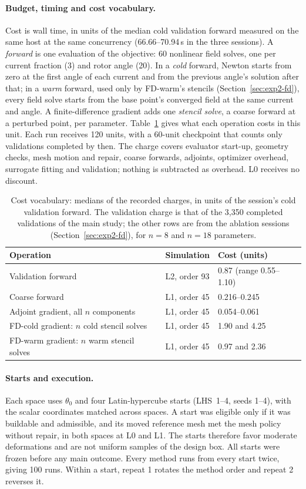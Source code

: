 \paragraph{Budget, timing and cost vocabulary.}
Cost is wall time, in units of the median cold validation forward measured
on the same host at the same concurrency (66.66--70.94\,s in the three
sessions). A \emph{forward} is one evaluation of the objective: 60
nonlinear field solves, one per current fraction (3) and rotor angle (20).
In a \emph{cold} forward, Newton starts from zero at the first angle of each
current and from the previous angle's solution after that; in a
\emph{warm} forward, used only by FD-warm's stencils
(Section~\ref{sec:exp2-fd}), every field solve starts from the base
point's converged field at the same current and angle. A
finite-difference gradient adds one \emph{stencil solve}, a coarse
forward at a perturbed point, per parameter. Table~\ref{tab:costs} gives
what each operation costs in this unit. Each run receives 120 units,
with a 60-unit checkpoint that counts only validations completed by then.
The charge covers evaluator start-up, geometry checks, mesh motion and
repair, coarse forwards, adjoints, optimizer overhead, surrogate fitting
and validation; nothing is subtracted as overhead. L0 receives no discount.

\begin{table}[H]\centering\small
\caption{Cost vocabulary: medians of the recorded charges, in units of
the session's cold validation forward. The validation charge is that of
the 3,350 completed validations of the main study; the other rows are
from the ablation sessions (Section~\ref{sec:exp2-fd}), for $n=8$ and
$n=18$ parameters.}
\label{tab:costs}
\begin{tabular}{lll}\toprule
Operation & Simulation & Cost (units)\\\midrule
Validation forward & L2, order 93 & 0.87 (range 0.55--1.10)\\
Coarse forward & L1, order 45 & 0.216--0.245\\
Adjoint gradient, all $n$ components & L1, order 45 & 0.054--0.061\\
FD-cold gradient: $n$ cold stencil solves & L1, order 45 & 1.90 and 4.25\\
FD-warm gradient: $n$ warm stencil solves & L1, order 45 & 0.97 and 2.36\\\bottomrule
\end{tabular}
\end{table}

\paragraph{Starts and execution.}
Each space uses $\theta_0$ and four Latin-hypercube starts (LHS~1--4, seeds 1--4),
with the scalar coordinates matched across spaces. A start was eligible
only if it was buildable and admissible, and its moved reference mesh met
the mesh policy without repair, in both spaces at L0 and L1. The starts
therefore favor moderate deformations and are not uniform samples of the
design box. All starts were frozen before any main outcome. Every method
runs from every start twice, giving 100 runs. Within a start, repeat 1
rotates the method order and repeat 2 reverses it.

